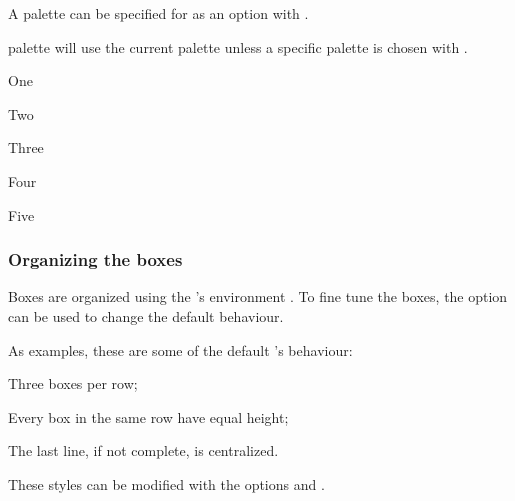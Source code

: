 \documentclass[a4paper, 11pt]{article}
\begin{document}
A palette can be specified for  as an option with .

\begin{optiondef}{palette}{}{}
     will use the current palette unless a specific palette is chosen with .

    \begin{example}{}
        \begin{PLTBoxRaster}[palette = sliced-citrus]
            \item One
            \item Two
            \item Three
            \item Four
            \item Five
        \end{PLTBoxRaster}
    \end{example}
\end{optiondef}

\subsubsection{Organizing the boxes}

Boxes are organized using the 's environment . To fine tune the boxes, the option  can be used to change the default  behaviour.

As examples, these are some of the default 's behaviour:
\begin{itemizeitemize}
    \item Three boxes per row;
    \item Every box in the same row have equal height;
    \item The last line, if not complete, is centralized.
\end{itemizeitemize}

These styles can be modified with the options  and .
\end{document}
